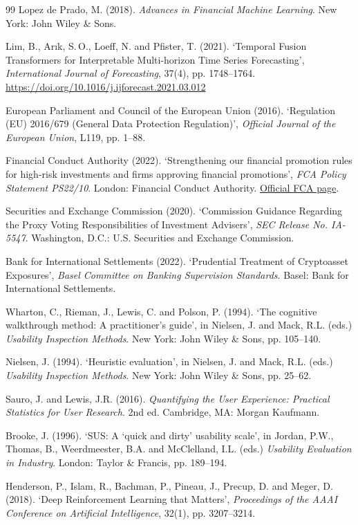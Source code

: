 \documentclass[11pt,a4paper]{article}
\begin{document}
\begin{thebibliography}{99}
 Lopez de Prado, M. (2018). \textit{Advances in Financial Machine Learning}. New York: John Wiley \& Sons.

 Lim, B., Ar\i k, S.\,O., Loeff, N. and Pfister, T. (2021). `Temporal Fusion Transformers for Interpretable Multi-horizon Time Series Forecasting', \textit{International Journal of Forecasting}, 37(4), pp. 1748--1764. \url{https://doi.org/10.1016/j.ijforecast.2021.03.012}

 European Parliament and Council of the European Union (2016). `Regulation (EU) 2016/679 (General Data Protection Regulation)', \textit{Official Journal of the European Union}, L119, pp. 1--88.

 Financial Conduct Authority (2022). `Strengthening our financial promotion rules for high-risk investments and firms approving financial promotions', \textit{FCA Policy Statement PS22/10}. London: Financial Conduct Authority. \href{https://www.fca.org.uk/publications/policy-statements/ps22-10-strengthening-our-financial-promotion-rules-high-risk-investments-firms-approving-financial-promotions}{Official FCA page}.

 Securities and Exchange Commission (2020). `Commission Guidance Regarding the Proxy Voting Responsibilities of Investment Advisers', \textit{SEC Release No. IA-5547}. Washington, D.C.: U.S. Securities and Exchange Commission.

 Bank for International Settlements (2022). `Prudential Treatment of Cryptoasset Exposures', \textit{Basel Committee on Banking Supervision Standards}. Basel: Bank for International Settlements.

 Wharton, C., Rieman, J., Lewis, C. and Polson, P. (1994). `The cognitive walkthrough method: A practitioner's guide', in Nielsen, J. and Mack, R.L. (eds.) \textit{Usability Inspection Methods}. New York: John Wiley \& Sons, pp. 105--140.

 Nielsen, J. (1994). `Heuristic evaluation', in Nielsen, J. and Mack, R.L. (eds.) \textit{Usability Inspection Methods}. New York: John Wiley \& Sons, pp. 25--62.

 Sauro, J. and Lewis, J.R. (2016). \textit{Quantifying the User Experience: Practical Statistics for User Research}. 2nd ed. Cambridge, MA: Morgan Kaufmann.

 Brooke, J. (1996). `SUS: A `quick and dirty' usability scale', in Jordan, P.W., Thomas, B., Weerdmeester, B.A. and McClelland, I.L. (eds.) \textit{Usability Evaluation in Industry}. London: Taylor \& Francis, pp. 189--194.

 Henderson, P., Islam, R., Bachman, P., Pineau, J., Precup, D. and Meger, D. (2018). `Deep Reinforcement Learning that Matters', \textit{Proceedings of the AAAI Conference on Artificial Intelligence}, 32(1), pp. 3207--3214.
\end{thebibliography}
\end{document}
